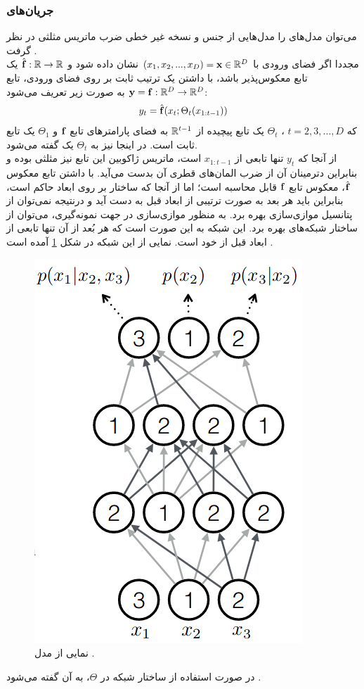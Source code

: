 \subsubsection{جریان‌های \autoregressive{}}
می‌توان مدل‌های \autoregressive{} را مدل‌هایی از جنس \normalizingflownets{} و نسخه غیر خطی ضرب ماتریس مثلثی در نظر گرفت \cite{flow_survey, iaf, maf}.
\\
مجددا اگر فضای ورودی با
$(x_1, x_2, ..., x_D) = {\bf x} \in {\mathbb{R}}^D$
نشان داده شود و
$\hat{{\bf f}} : {\mathbb{R}} \rightarrow {\mathbb{R}}$
یک تابع معکوس‌پذیر باشد، با داشتن یک ترتیب ثابت بر روی فضای ورودی، تابع \autoregressive{}
${\bf y} = {\bf f} : {\mathbb{R}}^D \rightarrow {\mathbb{R}}^D$
به صورت زیر تعریف می‌شود:
\begin{align}
	y_t = \hat{{\bf f}}(x_t; \Theta_t(x_{1:t-1}))
\end{align}
که $t= 2, 3, ..., D$
، $\Theta_t$
یک تابع پیچیده از ${\mathbb{R}}^{t-1}$ به فضای پارامترهای تابع ${\bf f}$ و $\Theta_1$ یک تابع ثابت است. در اینجا نیز به $\Theta_t$ یک \conditioner{} گفته می‌شود.
\\
از آنجا که $y_t$ تنها تابعی از $x_{1:t-1}$ است، ماتریس ژاکوبین این تابع نیز مثلثی بوده و بنابراین دترمینان آن از ضرب المان‌های قطری آن بدست می‌آید. با داشتن تابع معکوس $\hat{{\bf f}}$، معکوس تابع ${\bf f}$ قابل محاسبه است؛ اما از آنجا که ساختار \autoregressive{} بر روی ابعاد حاکم است، بنابراین  باید هر بعد به صورت ترتیبی از ابعاد قبل به دست آید و درنتیجه نمی‌توان از پتانسیل موازی‌سازی
بهره برد. به منظور موازی‌سازی در جهت نمونه‌گیری، می‌توان از ساختار شبکه‌های  بهره برد. این شبکه به این صورت است که هر بُعد از آن تنها تابعی از ابعاد قبل از خود است. نمایی از این شبکه در شکل \ref{fig:chap2:made} آمده است \cite{made}.
\begin{figure}[h]
    \centering
    \includegraphics[width=.25\textwidth]{images/made.png}
    \caption{
        نمایی از مدل 
        \cite{made}.
    }
\label{fig:chap2:made}
\end{figure}
در صورت استفاده از ساختار شبکه  در $\Theta$، به آن  گفته می‌شود \cite{iaf}.

